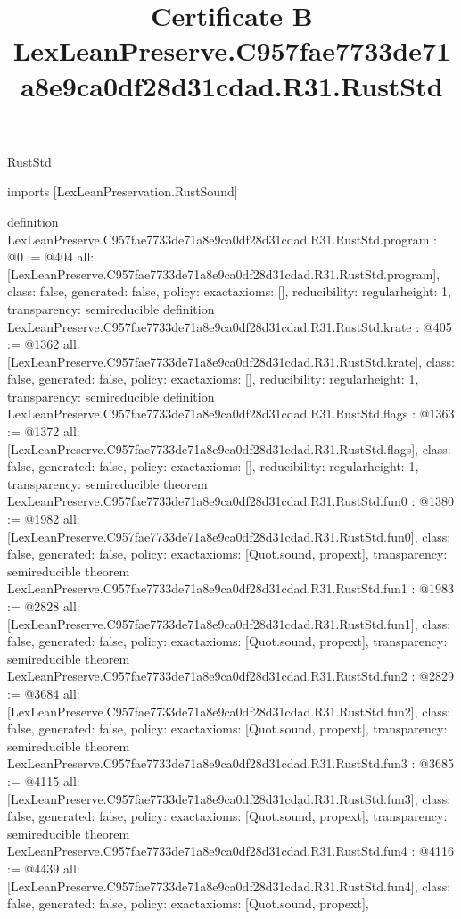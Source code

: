 \begin{lexlean}{RustStd}
\title{Certificate B LexLeanPreserve.C957fae7733de71a8e9ca0df28d31cdad.R31.RustStd}
\begin{coremodule}
imports [LexLeanPreservation.RustSound]

definition LexLeanPreserve.C957fae7733de71a8e9ca0df28d31cdad.R31.RustStd.program : @0 := @404 {
  all: [LexLeanPreserve.C957fae7733de71a8e9ca0df28d31cdad.R31.RustStd.program],
  class: false,
  generated: false,
  policy: exact{axioms: []},
  reducibility: regular{height: 1},
  transparency: semireducible
}
definition LexLeanPreserve.C957fae7733de71a8e9ca0df28d31cdad.R31.RustStd.krate : @405 := @1362 {
  all: [LexLeanPreserve.C957fae7733de71a8e9ca0df28d31cdad.R31.RustStd.krate],
  class: false,
  generated: false,
  policy: exact{axioms: []},
  reducibility: regular{height: 1},
  transparency: semireducible
}
definition LexLeanPreserve.C957fae7733de71a8e9ca0df28d31cdad.R31.RustStd.flags : @1363 := @1372 {
  all: [LexLeanPreserve.C957fae7733de71a8e9ca0df28d31cdad.R31.RustStd.flags],
  class: false,
  generated: false,
  policy: exact{axioms: []},
  reducibility: regular{height: 1},
  transparency: semireducible
}
theorem LexLeanPreserve.C957fae7733de71a8e9ca0df28d31cdad.R31.RustStd.fun0 : @1380 := @1982 {
  all: [LexLeanPreserve.C957fae7733de71a8e9ca0df28d31cdad.R31.RustStd.fun0],
  class: false,
  generated: false,
  policy: exact{axioms: [Quot.sound, propext]},
  transparency: semireducible
}
theorem LexLeanPreserve.C957fae7733de71a8e9ca0df28d31cdad.R31.RustStd.fun1 : @1983 := @2828 {
  all: [LexLeanPreserve.C957fae7733de71a8e9ca0df28d31cdad.R31.RustStd.fun1],
  class: false,
  generated: false,
  policy: exact{axioms: [Quot.sound, propext]},
  transparency: semireducible
}
theorem LexLeanPreserve.C957fae7733de71a8e9ca0df28d31cdad.R31.RustStd.fun2 : @2829 := @3684 {
  all: [LexLeanPreserve.C957fae7733de71a8e9ca0df28d31cdad.R31.RustStd.fun2],
  class: false,
  generated: false,
  policy: exact{axioms: [Quot.sound, propext]},
  transparency: semireducible
}
theorem LexLeanPreserve.C957fae7733de71a8e9ca0df28d31cdad.R31.RustStd.fun3 : @3685 := @4115 {
  all: [LexLeanPreserve.C957fae7733de71a8e9ca0df28d31cdad.R31.RustStd.fun3],
  class: false,
  generated: false,
  policy: exact{axioms: [Quot.sound, propext]},
  transparency: semireducible
}
theorem LexLeanPreserve.C957fae7733de71a8e9ca0df28d31cdad.R31.RustStd.fun4 : @4116 := @4439 {
  all: [LexLeanPreserve.C957fae7733de71a8e9ca0df28d31cdad.R31.RustStd.fun4],
  class: false,
  generated: false,
  policy: exact{axioms: [Quot.sound, propext]},
}
\end{coremodule}
\end{lexlean}
